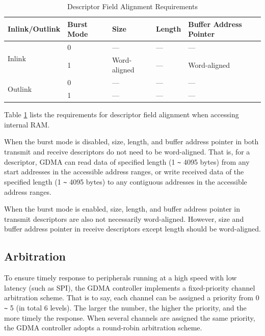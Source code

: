 \documentclass[main\_\_EN.tex]{subfiles}
\begin{document}
\begin{longtable}[c]{ | l | l | l | l | l | }
    \caption{Descriptor Field Alignment Requirements}
    \label{tab:gdma-inter-desc-param-align}
    \\\hline
    \rowcolor{lightgray}
    \textbf{Inlink/Outlink} & \textbf{Burst Mode} & \textbf{Size} & \textbf{Length} & \textbf{Buffer Address Pointer} \\\hline

    \multirow{2}{*}{Inlink}  & 0  & --- & ---  & --- \\\cline{2-5}
     & 1 & Word-aligned   & ---  & Word-aligned \\\hline
    \multirow{2}{*}{Outlink} & 0  & --- & ---  & --- \\\cline{2-5}
     & 1 & --- & ---  & --- \\\hline
\end{longtable}

Table \ref{tab:gdma-inter-desc-param-align} lists the requirements for descriptor field alignment when accessing internal RAM.

When the burst mode is disabled, size, length, and buffer address pointer in both transmit and receive descriptors do not need to be word-aligned. That is, for a descriptor, GDMA can read data of specified length (1 \verb+~+ 4095 bytes) from any start addresses in the accessible address ranges, or write received data of the specified length (1 \verb+~+ 4095 bytes) to any contiguous addresses in the accessible address ranges.

When the burst mode is enabled, size, length, and buffer address pointer in transmit descriptors are also not necessarily word-aligned. However, size and buffer address pointer in receive descriptors except length should be word-aligned.

\subsection{Arbitration}

To ensure timely response to peripherals running at a high speed with low latency (such as SPI), the GDMA controller implements a fixed-priority channel arbitration scheme. That is to say, each channel can be assigned a priority from 0 \verb+~+ 5 (in total 6 levels). The larger the number, the higher the priority, and the more timely the response. When several channels are assigned the same priority, the GDMA controller adopts a round-robin arbitration scheme.
\end{document}
